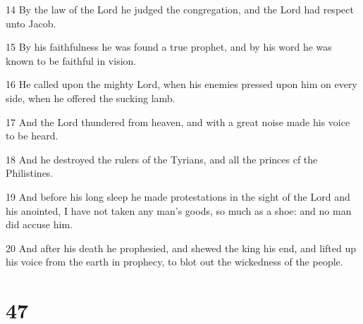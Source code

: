 \par 14 By the law of the Lord he judged the congregation, and the Lord had respect unto Jacob.
\par 15 By his faithfulness he was found a true prophet, and by his word he was known to be faithful in vision.
\par 16 He called upon the mighty Lord, when his enemies pressed upon him on every side, when he offered the sucking lamb.
\par 17 And the Lord thundered from heaven, and with a great noise made his voice to be heard.
\par 18 And he destroyed the rulers of the Tyrians, and all the princes cf the Philistines.
\par 19 And before his long sleep he made protestations in the sight of the Lord and his anointed, I have not taken any man's goods, so much as a shoe: and no man did accuse him.
\par 20 And after his death he prophesied, and shewed the king his end, and lifted up his voice from the earth in prophecy, to blot out the wickedness of the people.

\chapter{47}

